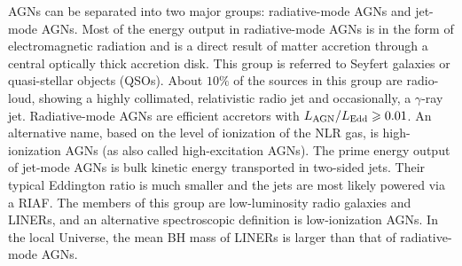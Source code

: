 \documentclass[12pt,a4paper]{article}
\begin{document}
AGNs can be separated into two major groups: radiative-mode AGNs and jet-mode AGNs. Most of the energy output in radiative-mode AGNs is in the form of electromagnetic radiation and is a direct result of matter accretion through a central optically thick accretion disk. This group is referred to Seyfert galaxies or quasi-stellar objects (QSOs). About $10\%$ of the sources in this group are radio-loud, showing a highly collimated, relativistic radio jet and occasionally, a $\gamma$-ray jet. Radiative-mode AGNs are efficient accretors with $L_{\rm AGN}/L_{\rm Edd} \geqslant 0.01$. An alternative name, based on the level of ionization of the NLR gas, is high-ionization AGNs (as also called high-excitation AGNs). The prime energy output of jet-mode AGNs is bulk kinetic energy transported in two-sided jets. Their typical Eddington ratio is much smaller and the jets are most likely powered via a RIAF. The members of this group are low-luminosity radio galaxies and LINERs, and an alternative spectroscopic definition is low-ionization AGNs. In the local Universe, the mean BH mass of LINERs is larger than that of radiative-mode AGNs.
\end{document}
